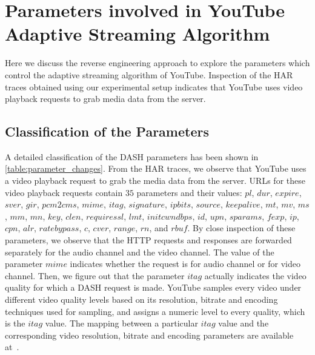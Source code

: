 \section{Parameters involved in YouTube Adaptive Streaming Algorithm}
\label{chap03s1:sec:parameters}
Here we discuss the reverse engineering approach to explore the parameters which control the adaptive streaming algorithm of YouTube.
Inspection of the \ac{HAR} traces obtained using our experimental setup indicates that YouTube uses video playback requests to grab media data from the server.
%
\subsection{Classification of the Parameters}
A detailed classification of the \ac{DASH} parameters has been shown in \tbl\ref{table:parameter_changes}. From the \ac{HAR} traces, we observe that YouTube uses a video playback request to grab the media data from the server. \acp{URL} for these video playback requests contain $35$ parameters and their values: $pl$, $dur$, $expire$, $sver$, $gir$, $pcm2cms$, $mime$, $itag$, $signature$, $ipbits$, $source$, $keepalive$, $mt$, $mv$, $ms$, $mm$, $mn$, $key$, $clen$, $requiressl$, $lmt$, $initcwndbps$, $id$, $upn$, $sparams$, $fexp$, $ip$, $cpn$, $alr$, $ratebypass$, $c$, $cver$, $range$, $rn$, and $rbuf$. By close inspection of these parameters, we observe that the \ac{HTTP} requests and responses are forwarded separately for the audio channel and the video channel. The value of the parameter $mime$ indicates whether the request is for audio channel or for video channel. Then, we figure out that the parameter $itag$ actually indicates the video quality for which a \ac{DASH} request is made. YouTube samples every video under different video quality levels based on its resolution, bitrate and encoding techniques used for sampling, and assigns a numeric level to every quality, which is the $itag$ value. The mapping between a particular $itag$ value and the corresponding video resolution, bitrate and encoding parameters are available at~\cite{itag}.


